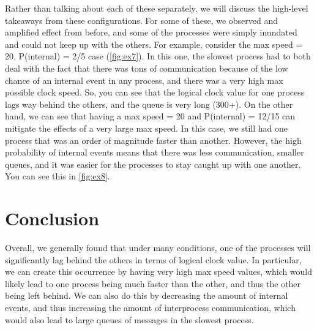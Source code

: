 \documentclass[]{article}
\begin{document}
Rather than talking about each of these separately, we will discuss the high-level takeaways from these configurations. For some of these, we observed and amplified effect from before, and some of the processes were simply inundated and could not keep up with the others. For example, consider the max speed = 20, P(internal) = 2/5 case (\ref{fig:ex7}). In this one, the slowest process had to both deal with the fact that there was tons of communication because of the low chance of an internal event in any process, and there was a very high max possible clock speed. So, you can see that the logical clock value for one process lags way behind the others, and the queue is very long (300+). On the other hand, we can see that having a max speed = 20 and P(internal) = 12/15 can mitigate the effects of a very large max speed. In this case, we still had one process that was an order of magnitude faster than another. However, the high probability of internal events means that there was less communication, smaller queues, and it was easier for the processes to stay caught up with one another. You can see this in \ref{fig:ex8}.

\begin{figure*}[!ht]
  \label{fig:ex7}
  \centering
    \texttt{[image: \{\{pictures/1457671692.8\_lc]}}}
    \texttt{[image: \{\{pictures/1457671692.8\_queue]}}}
    \caption{Experiments 7}
\end{figure*}

\begin{figure*}[!ht]
  \label{fig:ex8}
  \centering
    \texttt{[image: \{\{pictures/1457671753.09.lc]}}}
    \texttt{[image: \{\{pictures/1457671753.09.queue]}}}
    \caption{Experiments 8}
\end{figure*}

\section{Conclusion}
Overall, we generally found that under many conditions, one of the processes will significantly lag behind the others in terms of logical clock value. In particular, we can create this occurrence by having very high max speed values, which would likely lead to one process being much faster than the other, and thus the other being left behind.  We can also do this by decreasing the amount of internal events, and thus increasing the amount of interprocess communication, which would also lead to large queues of messages in the slowest process.


\end{document}
